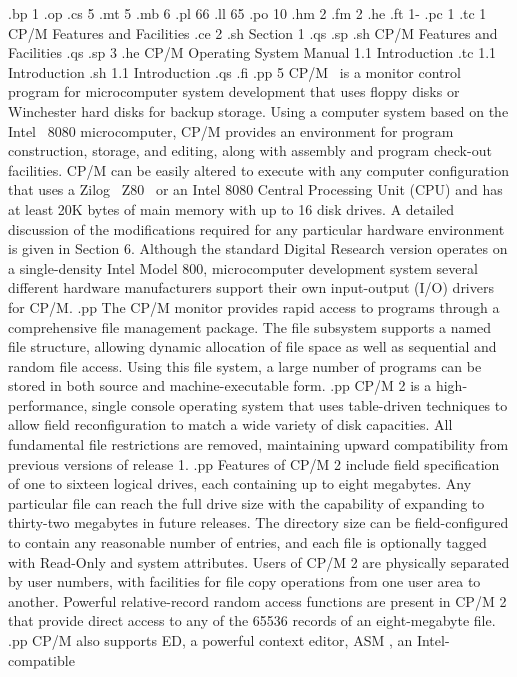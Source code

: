 .bp 1
.op
.cs 5
.mt 5
.mb 6
.pl 66
.ll 65
.po 10
.hm 2
.fm 2
.he
.ft                                1-%
.pc 1
.tc 1  CP/M Features and Facilities
.ce 2
.sh
Section 1
.qs
.sp
.sh
CP/M Features and Facilities
.qs
.sp 3
.he CP/M Operating System Manual                    1.1  Introduction
.tc    1.1  Introduction
.sh
1.1  Introduction
.qs
.fi
.pp 5
CP/M \ is a monitor control program for microcomputer system development that
uses floppy disks or Winchester hard disks for backup storage.  Using a
computer system based on the Intel \ 8080 microcomputer, CP/M provides an
environment for program construction, storage, and editing, along
with assembly and program check-out facilities.  CP/M can be easily
altered to execute with any computer
configuration that uses a Zilog \ Z80 \ or an Intel 8080 Central Processing
Unit (CPU) and has at least 20K bytes of main memory with up to 16 disk
drives.  A detailed discussion of the modifications required for any
particular hardware environment is given in Section 6.  Although the
standard Digital Research version operates on a single-density 
Intel Model 800, microcomputer development system several different 
hardware manufacturers support their own input-output (I/O) drivers for CP/M.
.pp
The CP/M monitor provides rapid access to programs through a comprehensive
file management package.  The file subsystem supports a named file structure,
allowing dynamic allocation of file space as well as sequential and random
file access.  Using this file system, a large number of programs can be
stored in both source and machine-executable form.
.pp
CP/M 2 is a high-performance, single console operating system that uses
table-driven techniques to allow field reconfiguration to match a wide
variety of disk capacities.  All fundamental file restrictions are removed,
maintaining upward compatibility from previous versions of release 1.
.pp
Features of CP/M 2 include field specification of one to sixteen logical
drives, each containing up to eight megabytes.  Any particular file can
reach the full drive size with the capability of expanding to thirty-two
megabytes in future releases.  The directory size can be field-configured to
contain any reasonable number of entries, and each file is optionally tagged
with Read-Only and system attributes.  Users of CP/M 2 are physically
separated by user numbers, with facilities for file copy operations from one
user area to another.  Powerful relative-record random access functions are
present in CP/M 2 that provide direct access to any of the 65536 records of
an eight-megabyte file.
.pp
CP/M also supports ED, a powerful context editor, ASM , an Intel-compatible
